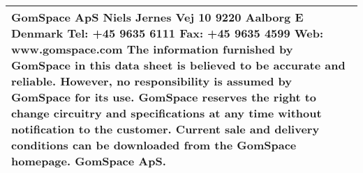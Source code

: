 \begin{table}[b]
\centering
\begin{tabular}{| >{\centering\arraybackslash}m{13cm} |}
\hline
GomSpace ApS  Niels Jernes Vej 10  9220 Aalborg E  Denmark\newline
Tel: +45 9635 6111  Fax: +45 9635 4599  Web: www.gomspace.com
\newline \newline
The information furnished by GomSpace in this data sheet is believed to be accurate and reliable. However, no responsibility is assumed by GomSpace for its use. GomSpace reserves the right to change circuitry and specifications at any time without notification to the customer. Current sale and delivery conditions can be downloaded from the GomSpace homepage.
\newline \newline
2012 GomSpace ApS.\\
\hline
\end{tabular}
\end{table}


